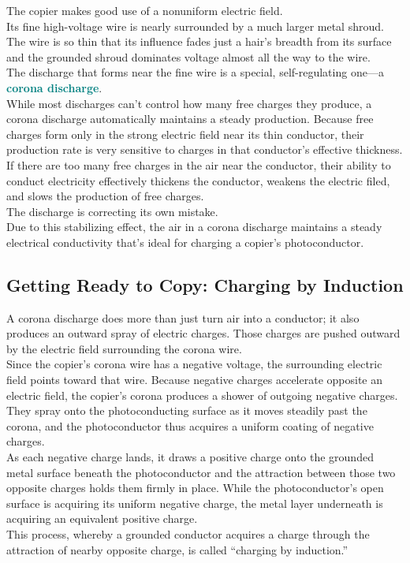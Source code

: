 \documentclass[12pt]{article}
\theoremstyle{definition}
\newcommand{\defnterm}[1]{\textbf{\textcolor{teal}{#1}}\index{#1}}
\begin{document}
The copier makes good use of a nonuniform electric field. \\
Its fine high-voltage wire is nearly surrounded by a much larger metal shroud.
The wire is so thin that its influence fades just a hair's breadth from its surface and the grounded shroud dominates voltage almost all the way to the wire. \\

The discharge that forms near the fine wire is a special, self-regulating one---a \defnterm{corona discharge}. \\
While most discharges can't control how many free charges they produce, a corona discharge automatically maintains a steady production.
Because free charges form only in the strong electric field near its thin conductor, their production rate is very sensitive to charges in that conductor's effective thickness.
If there are too many free charges in the air near the conductor, their ability to conduct electricity effectively thickens the conductor, weakens the electric filed, and slows the production of free charges. \\
The discharge is correcting its own mistake. \\

Due to this stabilizing effect, the air in a corona discharge maintains a steady electrical conductivity that's ideal for charging a copier's photoconductor.

\subsection{Getting Ready to Copy: Charging by Induction}
A corona discharge does more than just turn air into a conductor;
it also produces an outward spray of electric charges.
Those charges are pushed outward by the electric field surrounding the corona wire. \\
Since the copier's corona wire has a negative voltage, the surrounding electric field points toward that wire.
Because negative charges accelerate opposite an electric field, the copier's corona produces a shower of outgoing negative charges.
They spray onto the photoconducting surface as it moves steadily past the corona, and the photoconductor thus acquires a uniform coating of negative charges. \\

As each negative charge lands, it draws a positive charge onto the grounded metal surface beneath the photoconductor and the attraction between those two opposite charges holds them firmly in place.
While the photoconductor's open surface is acquiring its uniform negative charge, the metal layer underneath is acquiring an equivalent positive charge. \\
This process, whereby a grounded conductor acquires a charge through the attraction of nearby opposite charge, is called ``charging by induction.'' \\
\end{document}
